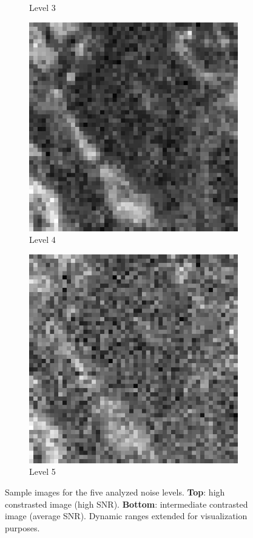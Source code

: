 \begin{figure}[htpb]
\begin{subfigure}{.2\textwidth}
\caption{Level 3}
\end{subfigure}%
\begin{subfigure}{.2\textwidth}
\includegraphics[width=\textwidth]{img/imageNoiseLevel4}
\caption{Level 4}
\end{subfigure}%
\begin{subfigure}{.2\textwidth}
\includegraphics[width=\textwidth]{img/imageNoiseLevel5}
\caption{Level 5}
\end{subfigure}
\caption{Sample images for the five analyzed noise levels. \textbf{Top}: high constrasted image (high SNR). \textbf{Bottom}: intermediate contrasted image (average SNR). Dynamic ranges extended for visualization purposes.}
\label{fig:exampleSimulatedNoisyLevels}
\end{figure}


